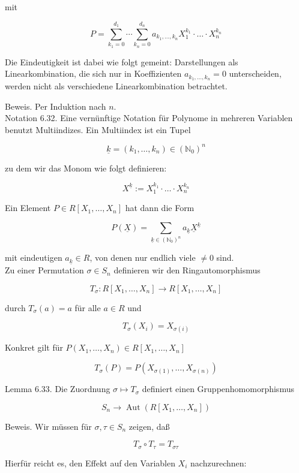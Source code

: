 \documentclass[10pt, letterpaper]{article}
\begin{document}
mit

$$
P=\sum_{k_{1}=0}^{d_{1}} \cdots \sum_{k_{n}=0}^{d_{n}} a_{k_{1}, \ldots, k_{n}} X_{1}^{k_{1}} \cdot \ldots \cdot X_{n}^{k_{n}}
$$

Die Eindeutigkeit ist dabei wie folgt gemeint: Darstellungen als Linearkombination, die sich nur in Koeffizienten $a_{k_{1}, \ldots, k_{n}}=0$ unterscheiden, werden nicht als verschiedene Linearkombination betrachtet.

Beweis. Per Induktion nach $n$.\\
Notation 6.32. Eine vernünftige Notation für Polynome in mehreren Variablen benutzt Multiindizes. Ein Multiindex ist ein Tupel

$$
\underline{k}=\left(k_{1}, \ldots, k_{n}\right) \in\left(\mathbb{N}_{0}\right)^{n}
$$

zu dem wir das Monom wie folgt definieren:

$$
X^{\underline{k}}:=X_{1}^{k_{1}} \cdot \ldots \cdot X_{n}^{k_{n}}
$$

Ein Element $P \in R\left[X_{1}, \ldots, X_{n}\right]$ hat dann die Form

$$
P(\underline{X})=\sum_{\underline{k} \in\left(\mathbb{N}_{0}\right)^{n}} a_{\underline{k}} \underline{X}^{\underline{k}}
$$

mit eindeutigen $a_{\underline{k}} \in R$, von denen nur endlich viele $\neq 0$ sind.\\
Zu einer Permutation $\sigma \in S_{n}$ definieren wir den Ringautomorphismus

$$
T_{\sigma}: R\left[X_{1}, \ldots, X_{n}\right] \rightarrow R\left[X_{1}, \ldots, X_{n}\right]
$$

durch $T_{\sigma}(a)=a$ für alle $a \in R$ und

$$
T_{\sigma}\left(X_{i}\right)=X_{\sigma(i)}
$$

Konkret gilt für $P\left(X_{1}, \ldots, X_{n}\right) \in R\left[X_{1}, \ldots, X_{n}\right]$

$$
T_{\sigma}(P)=P\left(X_{\sigma(1)}, \ldots, X_{\sigma(n)}\right)
$$

Lemma 6.33. Die Zuordnung $\sigma \mapsto T_{\sigma}$ definiert einen Gruppenhomomorphismus

$$
S_{n} \rightarrow \operatorname{Aut}\left(R\left[X_{1}, \ldots, X_{n}\right]\right)
$$

Beweis. Wir müssen für $\sigma, \tau \in S_{n}$ zeigen, daß

$$
T_{\sigma} \circ T_{\tau}=T_{\sigma \tau}
$$

Hierfür reicht es, den Effekt auf den Variablen $X_{i}$ nachzurechnen:
\end{document}
